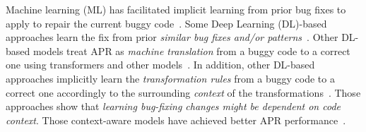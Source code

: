 Machine learning (ML)
has facilitated implicit learning from prior bug fixes to apply to repair
the current buggy
code~\cite{long2016automatic,long2017automatic,saha2017elixir}.
Some Deep Learning (DL)-based approaches learn the fix from prior {\em
  similar bug fixes and/or
  patterns}~\cite{gupta2017deepfix,white2019sorting,white2016deep}.
Other DL-based models treat APR as {\em machine translation} from a
buggy code to a correct one using transformers and other
models~\cite{chakrabortycodit,chen2018sequencer,hata2018learning,tufano2018empirical,see2017get}.
In addition, other DL-based approaches implicitly learn the {\em
  transformation rules} from a buggy code to a correct one accordingly
to the surrounding {\em context} of the
transformations~\cite{chen2018sequencer,icse20,cure-icse21,lutellier2020coconut}.
Those approaches show that {\em learning bug-fixing changes might be
  dependent on {\em code context}}.
Those context-aware models have achieved better APR
performance~\cite{icse20,lutellier2020coconut,cure-icse21}.


